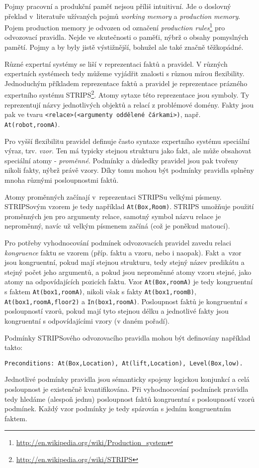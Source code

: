 Pojmy pracovní a produkční paměť nejsou příliš intuitivní. Jde o doslovný
překlad v~literatuře užívaných pojmů \emph{working memory} a \emph{production
memory}. Pojem production memory je odvozen od označení \emph{production
rules}\footnote{\url{http://en.wikipedia.org/wiki/Production\_system}} pro
odvozovací pravidla. Nejde ve skutečnosti o paměťi, nýbrž o obsahy pomyslných
pamětí. Pojmy  a  by
byly jistě výstižnější, bohužel ale také značně těžkopádné.

Různé expertní systémy se liší v reprezentaci faktů a pravidel. V různých
expertních systémech tedy můžeme vyjádřit znalosti s různou mírou flexibility.
Jednoduchým příkladem reprezentace faktů a pravidel je reprezentace prázného
expertního systému STRIPS\footnote{\url{http://en.wikipedia.org/wiki/STRIPS}}.
Atomy sytaxe této reprezentace jsou symboly. Ty reprezentují názvy jednotlivých
objektů a relací z problémové domény. Fakty jsou pak ve tvaru
\verb|<relace>(<argumenty oddělené čárkami>)|, např. \verb|At(robot,roomA)|.

Pro vyšší flexibilitu pravidel definuje často syntaxe expertního systému
speciální výraz, tzv. \emph{vzor}. Ten má typicky stejnou strukturu jako fakt,
ale může obsahovat speciální atomy - \emph{proměnné}. Podmínky a důsledky
pravidel jsou pak tvořeny nikoli fakty, nýbrž právě vzory. Díky tomu mohou být
podmínky pravidla splněny mnoha různými posloupnostmi faktů.

Atomy proměnných začínají v~reprezentaci STRIPSu velkými písmeny. STRIPSovým
vzorem je tedy například \verb|At(Box,Room)|. STRIPS umožňuje použití proměnných
jen pro argumenty relace, samotný symbol názvu relace je neproměnný, navíc už
velkým písmenem začíná (což je poněkud matoucí).

Pro potřeby vyhodnocování podmínek odvozovacích pravidel zavedu relaci
\emph{kongruence} faktu se vzorem (příp. faktu a vzoru, nebo i naopak). Fakt
a~vzor jsou kongruentní, pokud mají stejnou strukturu, tedy stejný název
predikátu a stejný počet jeho argumentů, a pokud jsou neproměnné atomy vzoru
stejné, jako atomy na odpovídajících pozicích faktu. Vzor \verb|At(Box,roomA)|
je tedy kongruentní s faktem \verb|At(box1,roomA)|, nikoli však s fakty
\verb|At(box1,roomB)|, \verb|At(box1,roomA,floor2)| a \verb|In(box1,roomA)|.
Posloupnost faktů je kongruentní s posloupností vzorů, pokud mají tyto stejnou
délku a jednotlivé fakty jsou kongruentní s odpovídajícími vzory (v daném
pořadí).

Podmínky STRIPSového odvozovacího pravidla mohou být definovány například takto:
\begin{verbatim}
Preconditions: At(Box,Location), At(lift,Location), Level(Box,low).
\end{verbatim}
Jednotlivé podmínky pravidla jsou sémanticky spojeny logickou konjunkcí a celá
posloupnost je existenčně kvantifikována. Při vyhodnocování podmínek pravidla
tedy hledáme (alespoň jednu) posloupnost faktů kongruentní s posloupností vzorů
podmínek. Každý vzor podmínky je tedy spárován s jedním kongruentním faktem.

